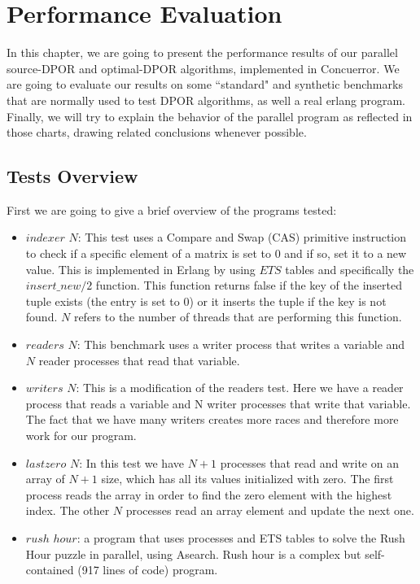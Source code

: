 \chapter{Performance Evaluation}
\label{perfresults}

In this chapter, we are going to present the performance results of our parallel source-DPOR and optimal-DPOR algorithms,
implemented in Concuerror. We are going to evaluate our results on some ``standard" and synthetic benchmarks that are normally
used to test DPOR algorithms, as well a real erlang program. Finally, we will try to explain the behavior of the parallel program as reflected in those
charts, drawing related conclusions whenever possible.

\section{Tests Overview}

First we are going to give a brief overview of the programs tested:

\begin{itemize}
    \item $indexer$ $N$: This test uses a Compare and Swap (CAS) primitive instruction to check if a specific element of
    a matrix is set to 0 and if so, set it to a new value. This is implemented in Erlang by using $ETS$ tables and specifically
    the $insert\_new/2$ function. This function returns false if the key of the inserted tuple exists (the entry is set to 0)
    or it inserts the tuple if the key is not found. $N$ refers to the number of threads that are performing this function.
    \item $readers$ $N$: This benchmark uses a writer process that writes a variable and $N$ reader processes that read that variable.
    \item $writers$ $N$: This is a modification of the readers test. Here we have a reader process that reads a variable and 
    N writer processes that write that variable. The fact that we have many writers creates more races and therefore more work
    for our program.
    \item $ lastzero$ $N$: In this test we have $N+1$ processes that read and write on an array of $N+1$ size, which has all its 
    values initialized with zero. The first process reads the array in order to find the zero element with the highest
    index. The other $N$ processes read an array element and update the next one.
    \item $rush$ $hour$: a program that uses processes and
    ETS tables to solve the Rush Hour puzzle in parallel, using A\textasteriskcentered  search. Rush hour is a complex but self-contained (917 lines of code) program.
\end{itemize}


